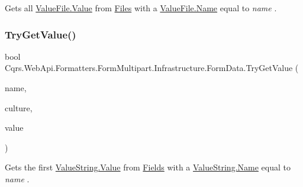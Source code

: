 Get\textquotesingle{}s all \hyperlink{classCqrs_1_1WebApi_1_1Formatters_1_1FormMultipart_1_1Infrastructure_1_1FormData_1_1ValueFile_aebbbefbeda7233acb846f54aaa2f26c2_aebbbefbeda7233acb846f54aaa2f26c2}{Value\+File.\+Value} from \hyperlink{classCqrs_1_1WebApi_1_1Formatters_1_1FormMultipart_1_1Infrastructure_1_1FormData_a09da7b76f703fc20899051d9d9ed17b0_a09da7b76f703fc20899051d9d9ed17b0}{Files} with a \hyperlink{classCqrs_1_1WebApi_1_1Formatters_1_1FormMultipart_1_1Infrastructure_1_1FormData_1_1ValueFile_a2410547f01c8ae8c6d5dd70d3f92284c_a2410547f01c8ae8c6d5dd70d3f92284c}{Value\+File.\+Name} equal to {\itshape name} . 

\mbox{\label{classCqrs_1_1WebApi_1_1Formatters_1_1FormMultipart_1_1Infrastructure_1_1FormData_ac4a6a0575ca53bd9fdd35537e0421575_ac4a6a0575ca53bd9fdd35537e0421575}} 
\subsubsection{\texorpdfstring{Try\+Get\+Value()}{TryGetValue()}\hspace{0.1cm}{\footnotesize\ttfamily [1/2]}}
{\footnotesize\ttfamily bool Cqrs.\+Web\+Api.\+Formatters.\+Form\+Multipart.\+Infrastructure.\+Form\+Data.\+Try\+Get\+Value (\begin{DoxyParamCaption}\item[{string}]{name,  }\item[{Culture\+Info}]{culture,  }\item[{out string}]{value }\end{DoxyParamCaption})}



Get\textquotesingle{}s the first \hyperlink{classCqrs_1_1WebApi_1_1Formatters_1_1FormMultipart_1_1Infrastructure_1_1FormData_1_1ValueString_a2e4eb245c5d5148672d233903f2dfcd1_a2e4eb245c5d5148672d233903f2dfcd1}{Value\+String.\+Value} from \hyperlink{classCqrs_1_1WebApi_1_1Formatters_1_1FormMultipart_1_1Infrastructure_1_1FormData_a91cfdcbb3a074aadee7e7fc228c04a6a_a91cfdcbb3a074aadee7e7fc228c04a6a}{Fields} with a \hyperlink{classCqrs_1_1WebApi_1_1Formatters_1_1FormMultipart_1_1Infrastructure_1_1FormData_1_1ValueString_a75a080b90171a612155590a997076016_a75a080b90171a612155590a997076016}{Value\+String.\+Name} equal to {\itshape name} . 

